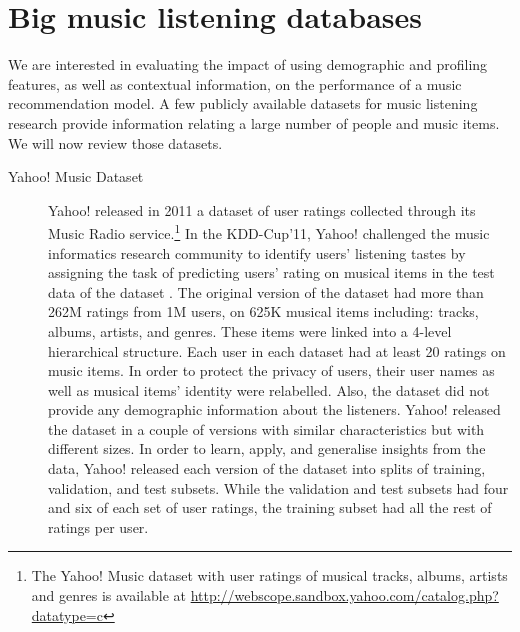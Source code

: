 \section{Big music listening databases}\label{section:music_metadatabases}
\graphicspath{{./figs/ch4/} }
We are interested in evaluating the impact of using demographic and profiling features, as well as contextual information, on the performance of a music recommendation model. A few publicly available datasets for music listening research provide information relating a large number of people and music items. We will now review those datasets.

\begin{description}
\item [Yahoo! Music Dataset] 
Yahoo! released in 2011 a dataset of user ratings collected through its Music Radio service.\footnote{The Yahoo! Music dataset with user ratings of musical tracks, albums, artists and genres is available at \url{http://webscope.sandbox.yahoo.com/catalog.php?datatype=c}} In the KDD-Cup'11, Yahoo! challenged the music informatics research community to identify users' listening tastes by assigning the task of predicting users' rating on musical items in the test data of the dataset \autocite{dror11yahooa}.
The original version of the dataset had more than 262M ratings from 1M users, on 625K musical items including: tracks, albums, artists, and genres. These items were linked into a 4-level hierarchical structure. 
Each user in each dataset had at least 20 ratings on music items. 
In order to protect the privacy of users, their user names as well as musical items' identity were relabelled. Also, the dataset did not provide any demographic information about the listeners. Yahoo! released the dataset in a couple of versions with similar characteristics but with different sizes. 
In order to learn, apply, and generalise insights from the data, Yahoo! released each version of the dataset into splits of training, validation, and test subsets. 
While the validation and test subsets had four and six of each set of user ratings, the training subset had all the rest of ratings per user. 



\end{description}
